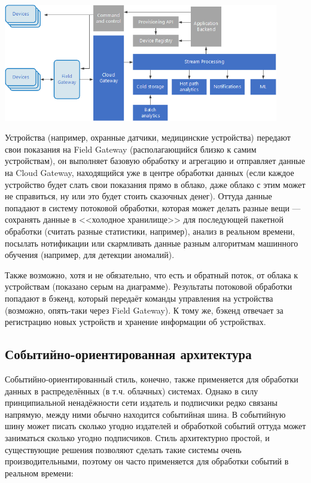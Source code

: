 \documentclass{../text-style}
\begin{document}
\begin{center}
    \includegraphics[width=0.9\textwidth]{iot.png}
\end{center}

Устройства (например, охранные датчики, медицинские устройства) передают свои показания на Field Gateway (располагающийся близко к самим устройствам), он выполняет базовую обработку и агрегацию и отправляет данные на Cloud Gateway, находящийся уже в центре обработки данных (если каждое устройство будет слать свои показания прямо в облако, даже облако с этим может не справиться, ну или это будет стоить сказочных денег). Оттуда данные попадают в систему потоковой обработки, которая может делать разные вещи --- сохранять данные в <<холодное хранилище>> для последующей пакетной обработки (считать разные статистики, например), анализ в реальном времени, посылать нотификации или скармливать данные разным алгоритмам машинного обучения (например, для детекции аномалий).

Также возможно, хотя и не обязательно, что есть и обратный поток, от облака к устройствам (показано серым на диаграмме). Результаты потоковой обработки попадают в бэкенд, который передаёт команды управления на устройства (возможно, опять-таки через Field Gateway). К тому же, бэкенд отвечает за регистрацию новых устройств и хранение информации об устройствах.

\subsection{Событийно-ориентированная архитектура}

Событийно-ориентированный стиль, конечно, также применяется для обработки данных в распределённых (в т.ч. облачных) системах. Однако в силу принципиальной ненадёжности сети издатель и подписчики редко связаны напрямую, между ними обычно находится событийная шина. В событийную шину может писать сколько угодно издателей и обработкой событий оттуда может заниматься сколько угодно подписчиков. Стиль архитектурно простой, и существующие решения позволяют сделать такие системы очень производительными, поэтому он часто применяется для обработки событий в реальном времени:
\end{document}
